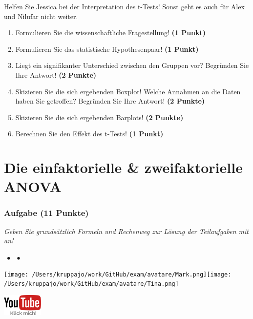\documentclass[a4paper, 9pt]{scrartcl}\usepackage[]{graphicx}\usepackage[]{xcolor}
\begin{document}
Helfen Sie Jessica bei der Interpretation des t-Tests! Sonst geht es auch für Alex und Nilufar nicht weiter.
  
\begin{enumerate}
  \item Formulieren Sie die wissenschaftliche Fragestellung! \textbf{(1 Punkt)}
  \item Formulieren Sie das statistische Hypothesenpaar! \textbf{(1 Punkt)}
\item Liegt ein signifikanter Unterschied zwischen den Gruppen vor? Begründen Sie Ihre Antwort! \textbf{(2 Punkte)}
\item Skizieren Sie die sich ergebenden Boxplot! Welche Annahmen an die Daten haben Sie getroffen? Begründen Sie Ihre
  Antwort! \textbf{(2 Punkte)} 
\item Skizieren Sie die sich ergebenden Barplots! \textbf{(2 Punkte)}
\item Berechnen Sie den Effekt des t-Tests! \textbf{(1 Punkt)}
\end{enumerate}
 
\clearpage
\part{Die einfaktorielle \& zweifaktorielle ANOVA}

\section{Aufgabe \hfill (11 Punkte)}

\textit{Geben Sie grundsätzlich Formeln und Rechenweg zur Lösung der Teilaufgaben mit an!} \\[1Ex]
 

 
\ifcollection
\begin{flushright}
\tiny\vspace{-3Ex}
\textbf{\examinhaltstart}
\exammodulemathstat $\;\bullet$
\exammodulestat $\;\bullet$
\exammodulestatbbv 
\vspace{-4Ex}
\end{flushright}
\begin{minipage}[t]{0.5\textwidth}
\texttt{[image: /Users/kruppajo/work/GitHub/exam/avatare/Mark.png]}\hspace{-4mm}\texttt{[image: /Users/kruppajo/work/GitHub/exam/avatare/Tina.png]}
\end{minipage}
\begin{minipage}[t]{0.5\textwidth}
\hfill
\href{https://youtu.be/kHmfEmU6lrk}{\includegraphics[width = 2cm]{img/youtube}}
\end{minipage}
\fi
\end{document}
